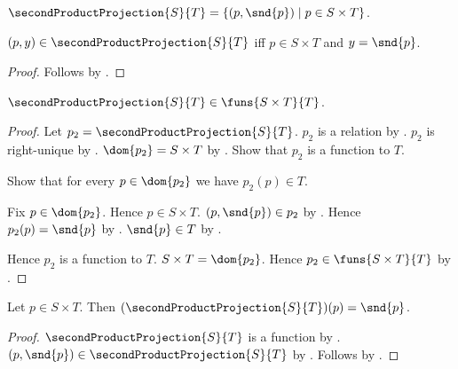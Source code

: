 \begin{definition}\label{second_product_projection}
    $\secondProductProjection{S}{T}
        =\{(p,\snd{p})\mid p\in S\times T\}$.
\end{definition}

\begin{proposition}\label{second_product_projection_iff}
    $(p,y)\in\secondProductProjection{S}{T}$ iff
        $p\in S\times T$ and $y=\snd{p}$.
\end{proposition}
\begin{proof}
    Follows by .
\end{proof}

\begin{proposition}\label{second_product_projection_type}
    $\secondProductProjection{S}{T}\in\funs{S\times T}{T}$.
\end{proposition}
\begin{proof}
    Let $p_2=\secondProductProjection{S}{T}$.
    $p_2$ is a relation by .
    $p_2$ is right-unique by
        .
    $\dom{p_2}=S\times T$ by
        .
    Show that $p_2$ is a function to $T$.
    \begin{subproof}
        Show that for every $p\in\dom{p_2}$ we have $p_2(p)\in T$.
        \begin{subproof}
            Fix $p\in\dom{p_2}$.
            Hence $p\in S\times T$.
            $(p,\snd{p})\in p_2$ by
                .
            Hence $p_2(p)=\snd{p}$ by .
            $\snd{p}\in T$ by .
        \end{subproof}
    \end{subproof}
    Hence $p_2$ is a function to $T$.
    $S\times T=\dom{p_2}$.
    Hence $p_2\in\funs{S\times T}{T}$ by .
\end{proof}

\begin{proposition}\label{second_product_projection_apply}
    Let $p\in S\times T$.
    Then $(\secondProductProjection{S}{T})(p)=\snd{p}$.
\end{proposition}
\begin{proof}
    $\secondProductProjection{S}{T}$ is a function by
        .
    $(p,\snd{p})\in\secondProductProjection{S}{T}$ by
        .
    Follows by .
\end{proof}

